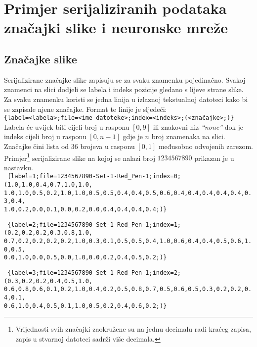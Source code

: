 \chapter{Primjer serijaliziranih podataka značajki slike i neuronske mreže}
\label{ch:primjer-serijaliziranih-podataka-znacajki-slike-i-neuronske-mreze}

\section*{Značajke slike}
Serijalizirane značajke slike zapisuju se za svaku znamenku pojedinačno. Svakoj znamenci na slici dodjeli se labela
i indeks pozicije gledano s lijeve strane slike. Za svaku znamenku koristi se jedna linija u izlaznoj tekstualnoj
datoteci kako bi se zapisale njene značajke. Format te linije je sljedeći:\\
\footnotesize
\texttt{\{label=<labela>;file=<ime datoteke>;index=<indeks>;(<značajke>;)\}}\\
\normalsize
Labela će uvijek biti cijeli broj u rasponu $[0, 9]$ ili znakovni niz \emph{``none''} dok je indeks cijeli broj u
rasponu $[0, n - 1]$ gdje je $n$ broj znamenaka na slici. Značajke čini lista od 36 brojeva u rasponu $[0, 1]$ međusobno
odvojenih zarezom. Primjer\footnote{Vrijednosti svih značajki zaokružene su na jednu decimalu radi kraćeg zapisa,
zapis u stvarnoj datoteci sadrži više decimala.} serijalizirane slike na kojoj se nalazi broj $1234567890$ prikazan je u
nastavku.\\

\scriptsize
\texttt{
\{label=1;file=1234567890-Set-1-Red\_Pen-1;index=0;(1.0,1.0,0.4,0.7,1.0,1.0,\\
1.0,1.0,0.5,0.2,1.0,1.0,0.5,0.5,0.4,0.4,0.5,0.6,0.4,0.4,0.4,0.4,0.4,0.3,0.4,\\
1.0,0.2,0.0,0.1,0.0,0.2,0.0,0.4,0.4,0.4,0.4;)\}\\
}

\texttt{
\{label=2;file=1234567890-Set-1-Red\_Pen-1;index=1;(0.2,0.2,0.2,0.3,0.8,1.0,\\
0.7,0.2,0.2,0.2,0.2,1.0,0.3,0.1,0.5,0.5,0.4,1.0,0.6,0.4,0.4,0.5,0.6,1.0,0.5,\\
0.0,1.0,0.0,0.5,0.0,1.0,0.0,0.2,0.4,0.5,0.2;)\}\\
}

\texttt{
\{label=3;file=1234567890-Set-1-Red\_Pen-1;index=2;(0.3,0.2,0.2,0.4,0.5,1.0,\\
0.6,0.8,0.6,0.1,0.2,1.0,0.4,0.2,0.5,0.8,0.7,0.5,0.6,0.5,0.3,0.2,0.2,0.4,0.1,\\
0.6,1.0,0.4,0.5,0.1,1.0,0.5,0.2,0.4,0.6,0.2;)\}\\
}

